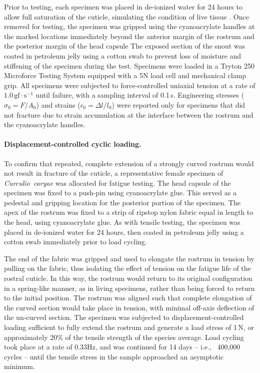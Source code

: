 \documentclass[twocolumn, linenumbers, superscriptaddress, nofootinbib]{revtex4-1}
\begin{document}
				Prior to testing, each specimen was placed in de-ionized water for 24 hours to allow full saturation of the cuticle, simulating the condition of live tissue \cite{Klocke2011}.
				Once removed for testing, the specimen was gripped using the cyanoacrylate handles at the marked locations immediately beyond the anterior margin of the rostrum and the posterior margin of the head capsule
				The exposed section of the snout was coated in petroleum jelly using a cotton swab to prevent loss of moisture and stiffening of the specimen during the test.
				Specimens were loaded in a Tryton 250 Microforce Testing System equipped with a 5N load cell and mechanical clamp grip.
				All specimens were subjected to force-controlled uniaxial tension at a rate of $1.0 \,\text{gf}\cdot\text{s}^{-1}$ until failure, with a sampling interval of 0.1\,s.
				Engineering stresses ($\sigma_0=F/A_0$) and strains ($\epsilon_0=\Delta{l}/l_0$) were reported only for specimens that did not fracture due to strain accumulation at the interface between the rostrum and the cyanoacrylate handles.
				
			\paragraph*{Displacement-controlled cyclic loading.}
				To confirm that repeated, complete extension of a strongly curved rostrum would not result in fracture of the cuticle, a representative female specimen of \textit{Curculio~caryae} was allocated for fatigue testing.
				The head capsule of the specimen was fixed to a push-pin using cyanoacrylate glue.
				This served as a pedestal and gripping location for the posterior portion of the specimen.
				The apex of the rostrum was fixed to a strip of ripstop nylon fabric equal in length to the head, using cyanoacrylate glue.
				As with tensile testing, the specimen was placed in de-ionized water for 24 hours, then coated in petroleum jelly using a cotton swab immediately prior to load cycling.
				
				The end of the fabric was gripped and used to elongate the rostrum in tension by pulling on the fabric, thus isolating the effect of tension on the fatigue life of the rostral cuticle.
				In this way, the rostrum would return to its original configuration in a spring-like manner, as in living specimens, rather than being forced to return to the initial position.
				The rostrum was aligned such that complete elongation of the curved section would take place in tension, with minimal off-axis deflection of the un-curved section.
				The specimen was subjected to displacement-controlled loading sufficient to fully extend the rostrum and generate a load stress of 1\,N, or approximately 20\% of the tensile strength of the species average.
				Load cycling took place at a rate of 0.33Hz, and was continued for 14 days -- i.e., ~400,000 cycles -- until the tensile stress in the sample approached an asymptotic minimum.
				
\end{document}
